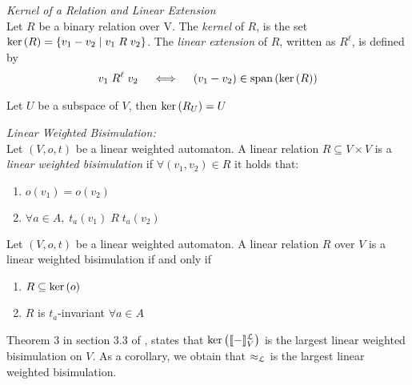\begin{defn}
  \textit{Kernel of a Relation and Linear Extension} \\
  Let $R$ be a binary relation over V. 
  The \textit{kernel} of $R$, is the set 
  $\text{ker}\left(R\right) = \left\lbrace v_1 - v_2 \mid v_1 \; R \; v_2 \right\rbrace$.
  The \textit{linear extension} of $R$, written as $R^\ell$, is defined by 
  \begin{equation*}
    \begin{aligned}
      v_1 \; R^\ell \; v_2  \quad \iff \quad (v_1 - v_2) \in \text{span}\left(\text{ker}\left(R\right)\right)
    \end{aligned}
  \end{equation*}
\end{defn}

\begin{lem}
  Let $U$ be a subspace of $V$, then $\text{ker}\left(R_U\right) = U$
\end{lem}

\begin{defn}
  \textit{Linear Weighted Bisimulation:} \\
  Let $(V, o, t)$ be a linear weighted automaton. A linear relation 
  $R \subseteq V \times V$ is a \textit{linear weighted bisimulation} if 
  $\forall (v_1, v_2) \in R$ it holds that: 
  \begin{center}
    \begin{enumerate}
      \item $o(v_1) = o(v_2)$
      \item $\forall a \in A, \; t_a(v_1) \; R \; t_a(v_2)$
    \end{enumerate}
  \end{center}
\end{defn}

\begin{lem}
  Let $(V, o, t)$ be a linear weighted automaton. A linear relation 
  $R$ over $V$ is a linear weighted bisimulation if and only if
\end{lem}
  \begin{center}
    \begin{enumerate}
      \item $R \subseteq \text{ker}\left(o\right)$
      \item $R$ is $t_a$-invariant $\forall a \in A$
    \end{enumerate}
  \end{center}

Theorem 3 in section 3.3 of \cite{BONCHI201277}, states that 
$\text{ker}\left(\llbracket-\rrbracket^\mathcal{L}_{V}\right)$ is the largest linear weighted bisimulation on $V$.
As a corollary, we obtain that $\approx_{\mathcal{L}}$ is the largest linear weighted bisimulation.

